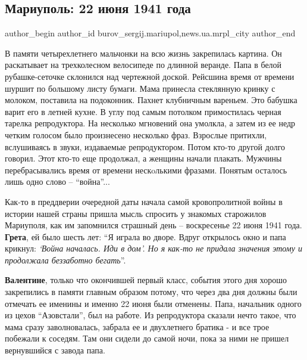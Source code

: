  
 
 
 
 
 
\subsection{Мариуполь: 22 июня 1941 года}
\label{sec:22_06_2018.stz.news.ua.mrpl_city.1.mariupol_22_iunja_1941_goda}
 
\ifcmt
 author_begin
   author_id burov_sergij.mariupol,news.ua.mrpl_city
 author_end
\fi


В памяти четырехлетнего мальчонки на всю жизнь закрепилась картина. Он
раскатывает на трехколесном велосипеде по длинной веранде. Папа в белой
рубашке-сеточке склонился над чертежной доской. Рейсшина время от времени
шуршит по большому листу бумаги. Мама принесла стеклянную кринку с молоком,
поставила на подоконник. Пахнет клубничным вареньем. Это бабушка варит его в
летней кухне. В углу под самым потолком примостилась черная тарелка
репродуктора. На несколько мгновений она умолкла, а затем из ее недр четким
голосом было произнесено несколько фраз. Взрослые притихли, вслушиваясь в
звуки, издаваемые репродуктором. Потом кто-то другой долго говорил. Этот кто-то
еще продолжал, а женщины начали плакать. Мужчины перебрасывались время от
времени нескoлькими фразами. Понятым осталось лишь одно слово – \enquote{война}...

Как-то в преддверии очередной даты начала самой кровопролитной войны в истории
нашей страны пришла мысль спросить у знакомых старожилов Мариуполя, как им
запомнился страшный день – воскресенье 22 июня 1941 года. \textbf{Грета}, ей было шесть
лет: \enquote{Я играла во дворе. Вдруг открылось окно и папа крикнул: \emph{\enquote{Война началась.
Иди в дом}. Но я как-то не придала значения этому и продолжала беззаботно
бегать}}. 

\textbf{Валентине}, только что окончившей первый класс, события этого дня хорошо
закрепились в памяти главным образом потому, что через два дня должны были
отмечать ее именины и именно 22 июня были отменены. Папа, начальник одного из
цехов \enquote{Азовстали}, был на работе. Из репродуктора сказали нечто такое, что мама
сразу заволновалась, забрала ее и двухлетнего братика - и все трое побежали к
соседям. Там они сидели до самой ночи, пока за ними не пришел вернувшийся с
завода папа.

